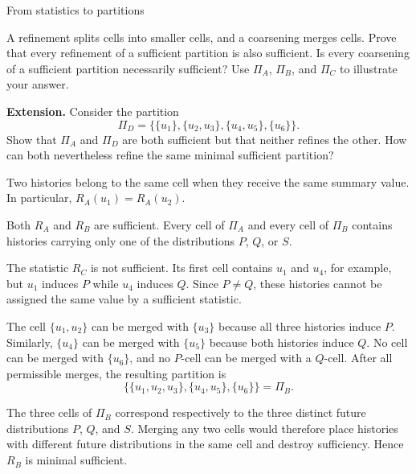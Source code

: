 \begin{exercise}[Core]{From statistics to partitions}
\begin{parts}
    \item A refinement splits cells into smaller cells, and a coarsening merges cells.
      Prove that every refinement of a sufficient partition is also
      sufficient. Is every coarsening of a sufficient partition necessarily
      sufficient? Use $\Pi_A$, $\Pi_B$, and $\Pi_C$ to illustrate your answer.

    \item \textbf{Extension.} Consider the partition
      \[
        \Pi_D
          =\bigl\{\{u_1\},\{u_2,u_3\},\{u_4,u_5\},\{u_6\}\bigr\}.
      \]
      Show that $\Pi_A$ and $\Pi_D$ are both sufficient but that neither
      refines the other. How can both nevertheless refine the same minimal
      sufficient partition?
  \end{parts}

  \begin{solution}
    \begin{parts}
      \item Two histories belong to the same cell when they receive
        the same summary value. In particular,
        $R_A(u_1)=R_A(u_2)$.

      \item Both $R_A$ and $R_B$ are sufficient. Every cell of $\Pi_A$ and
        every cell of $\Pi_B$ contains histories carrying only one of the
        distributions $P$, $Q$, or $S$.

        The statistic $R_C$ is not sufficient. Its first cell contains $u_1$
        and $u_4$, for example, but $u_1$ induces $P$ while $u_4$ induces $Q$.
        Since $P\neq Q$, these histories cannot be assigned the same value by
        a sufficient statistic.

      \item The cell $\{u_1,u_2\}$ can be merged with $\{u_3\}$ because all
        three histories induce $P$. Similarly, $\{u_4\}$ can be merged with
        $\{u_5\}$ because both histories induce $Q$. No cell can be merged
        with $\{u_6\}$, and no $P$-cell can be merged with a $Q$-cell. After
        all permissible merges, the resulting partition is
        \[
          \bigl\{\{u_1,u_2,u_3\},\{u_4,u_5\},\{u_6\}\bigr\}=\Pi_B.
        \]

      \item The three cells of $\Pi_B$ correspond respectively to the three
        distinct future distributions $P$, $Q$, and $S$. Merging any two cells
        would therefore place histories with different future distributions
        in the same cell and destroy sufficiency. Hence $R_B$ is minimal
        sufficient.


\end{parts}
\end{solution}
\end{exercise}
